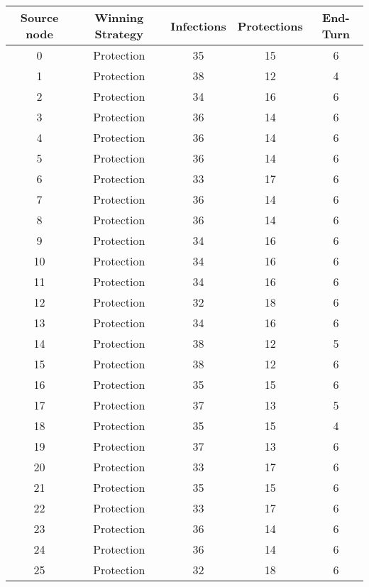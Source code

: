 \documentclass[results.tex]{subfiles}
\begin{document}
\begin{center}
  \begin{tabular}{| c || c | c | c | c |}
    \hline
    {\bfseries Source node} & {\bfseries Winning Strategy} & {\bfseries Infections} & {\bfseries Protections} & {\bfseries End-Turn} \\  %
    \hline\hline
    0 & Protection & 35 & 15 & 6 \\ 
    \hline
    1 & Protection & 38 & 12 & 4 \\ 
    \hline
    2 & Protection & 34 & 16 & 6 \\ 
    \hline
    3 & Protection & 36 & 14 & 6 \\ 
    \hline
    4 & Protection & 36 & 14 & 6 \\ 
    \hline
    5 & Protection & 36 & 14 & 6 \\ 
    \hline
    6 & Protection & 33 & 17 & 6 \\ 
    \hline
    7 & Protection & 36 & 14 & 6 \\ 
    \hline
    8 & Protection & 36 & 14 & 6 \\ 
    \hline
    9 & Protection & 34 & 16 & 6 \\ 
    \hline
    10 & Protection & 34 & 16 & 6 \\ 
    \hline
    11 & Protection & 34 & 16 & 6 \\ 
    \hline
    12 & Protection & 32 & 18 & 6 \\ 
    \hline
    13 & Protection & 34 & 16 & 6 \\ 
    \hline
    14 & Protection & 38 & 12 & 5 \\ 
    \hline
    15 & Protection & 38 & 12 & 6 \\ 
    \hline
    16 & Protection & 35 & 15 & 6 \\ 
    \hline
    17 & Protection & 37 & 13 & 5 \\ 
    \hline
    18 & Protection & 35 & 15 & 4 \\ 
    \hline
    19 & Protection & 37 & 13 & 6 \\ 
    \hline
    20 & Protection & 33 & 17 & 6 \\ 
    \hline
    21 & Protection & 35 & 15 & 6 \\ 
    \hline
    22 & Protection & 33 & 17 & 6 \\ 
    \hline
    23 & Protection & 36 & 14 & 6 \\ 
    \hline
    24 & Protection & 36 & 14 & 6 \\ 
    \hline
    25 & Protection & 32 & 18 & 6 \\ 

\end{tabular}
\end{center}
\end{document}
